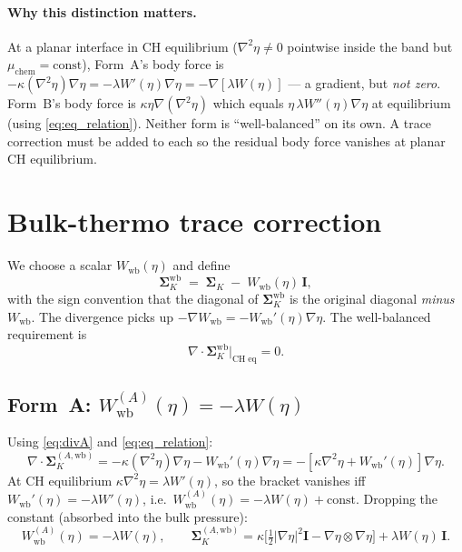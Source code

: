 \documentclass[11pt]{article}
\newcommand{\dive}{\nabla\!\cdot\!}
\newcommand{\grad}{\nabla}
\newcommand{\II}{\mathbf{I}}
\newcommand{\SK}{\boldsymbol{\Sigma}_K}
\newcommand{\Wb}{W_{\!\mathrm{wb}}}
\begin{document}
\paragraph{Why this distinction matters.} At a planar interface in CH
equilibrium ($\grad^2\eta\ne 0$ pointwise inside the band but
$\mu_{\mathrm{chem}}=\mathrm{const}$), Form~A's body force is
$-\kappa(\grad^2\eta)\grad\eta = -\lambda W'(\eta)\grad\eta = -\grad[\lambda W(\eta)]$ ---
a gradient, but \emph{not zero}. Form~B's body force is
$\kappa\eta\grad(\grad^2\eta)$ which equals $\eta\,\lambda W''(\eta)\grad\eta$
at equilibrium (using \eqref{eq:eq_relation}). Neither form is
``well-balanced'' on its own. A trace correction must be added to each
so the residual body force vanishes at planar CH equilibrium.

\section{Bulk-thermo trace correction}

We choose a scalar $\Wb(\eta)$ and define
\begin{equation}
\SK^{\!\mathrm{wb}} \;=\; \SK \;-\; \Wb(\eta)\,\II,
\label{eq:SKwb}
\end{equation}
with the sign convention that the diagonal of $\SK^{\!\mathrm{wb}}$ is
the original diagonal \emph{minus} $\Wb$. The divergence picks up
$-\grad\Wb = -\Wb'(\eta)\grad\eta$. The well-balanced requirement is
\begin{equation}
\dive\SK^{\!\mathrm{wb}}\big|_{\mathrm{CH\;eq}} = 0.
\label{eq:wb}
\end{equation}

\subsection{Form~A: \texorpdfstring{$\Wb^{(A)}(\eta) = -\lambda W(\eta)$}{Wb(A) = -lambda W}}

Using \eqref{eq:divA} and \eqref{eq:eq_relation}:
\begin{equation}
\dive\SK^{(A,\mathrm{wb})}
   = -\kappa(\grad^2\eta)\grad\eta - \Wb'(\eta)\grad\eta
   = -[\kappa\grad^2\eta + \Wb'(\eta)]\grad\eta.
\end{equation}
At CH equilibrium $\kappa\grad^2\eta = \lambda W'(\eta)$, so the bracket
vanishes iff $\Wb'(\eta) = -\lambda W'(\eta)$, i.e.\
$\Wb^{(A)}(\eta) = -\lambda W(\eta) + \mathrm{const}$. Dropping the constant
(absorbed into the bulk pressure):
\begin{equation}
\boxed{\,\Wb^{(A)}(\eta) = -\lambda W(\eta),\qquad
\SK^{(A,\mathrm{wb})} = \kappa\big[\tfrac12|\grad\eta|^2\II - \grad\eta\!\otimes\!\grad\eta\big] + \lambda W(\eta)\,\II.\,}
\label{eq:Awb}
\end{equation}
\end{document}
